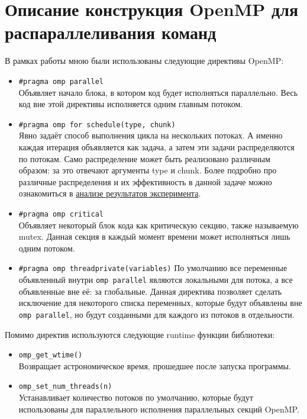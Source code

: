\documentclass[14pt, russian, onesize]{extreport}
\begin{document}
\section*{Описание конструкция OpenMP для распараллеливания команд}
В рамках работы мною были использованы следующие директивы OpenMP:
\begin{itemize}
    \item \texttt{\#pragma omp parallel}\\
        Объявляет начало блока, в котором код будет исполняться параллельно.
        Весь код вне этой директивы исполняется одним главным потоком. 
    \item \texttt{\#pragma omp for schedule(type, chunk)}\\
        Явно задаёт способ выполнения цикла на нескольких потоках. А именно
        каждая итерация объявляется как задача, а затем эти задачи распределяются
        по потокам. Само распределение может быть реализовано различным образом:
        за это отвечают аргументы type и chunk. Более подробно про различные
        распределения и их эффективность в данной задаче можно ознакомиться
        в \hyperref[experiment]{анализе результатов эксперимента}.
    \item \texttt{\#pragma omp critical}\\
        Объявляет некоторый блок кода как критическую секцию, также называемую
        mutex. Данная секция в каждый момент времени может исполняться лишь 
        одним потоком.
    \item \texttt{\#pragma omp threadprivate(variables)}
        По умолчанию все переменные объявленный внутри \texttt{omp parallel}
        являются локальными для потока, а все объявленные вне её: за 
        глобальные. Данная директива позволяет сделать исключение для 
        некоторого списка переменных, которые будут объявлены вне 
        \texttt{omp parallel}, но будут созданными для каждого
        из потоков в отдельности.
\end{itemize}
Помимо директив используются следующие runtime функции библиотеки:
\begin{itemize}
    \item \texttt{omp\_get\_wtime()}\\
        Возвращает астрономическое время, прошедшее после запуска
        программы. 
    \item \texttt{omp\_set\_num\_threads(n)}\\
        Устанавливает количество потоков по умолчанию, которые будут
        использованы для параллельного исполнения параллельных секций OpenMP.
\end{itemize}
\end{document}
